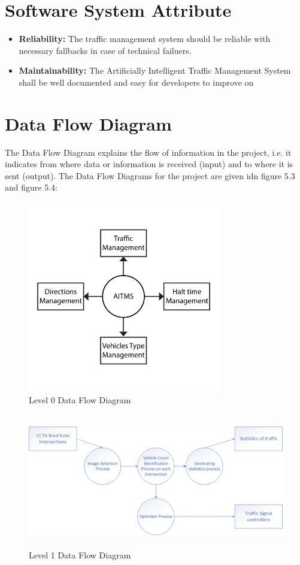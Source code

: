 \documentclass[openany,12pt]{report}
\begin{document}
	\section{Software System Attribute}
	\begin{itemize}
		
		\item{\textbf{Reliability:} The traffic management system should be reliable with necessary fallbacks in case of technical failuers.}
		
		\item{\textbf{Maintainability:}  The Artificially Intelligent Traffic Management System shall be well documented and easy for developers to improve on}
		
	\end{itemize}
	
	\section{Data Flow Diagram}
	
	\hspace*{0.5in}The Data Flow Diagram explains the flow of information in the project, i.e. it indicates from where data or information is received (input) and to where it is sent (output). The Data Flow Diagrams for the project are given idn figure 5.3 and figure 5.4:\\
	
	\begin{figure}[H]
		\centering
		\includegraphics[height=3.3in]{./Diagrams/PNG/dataflow}
		\caption{Level 0 Data Flow Diagram}
	\end{figure}
	
	\begin{figure}[H]
		\centering
		\includegraphics[width=6.8in,height=2.3in]{./Diagrams/PNG/dfd1}
		\caption{Level 1 Data Flow Diagram}
	\end{figure}
	
\end{document}
